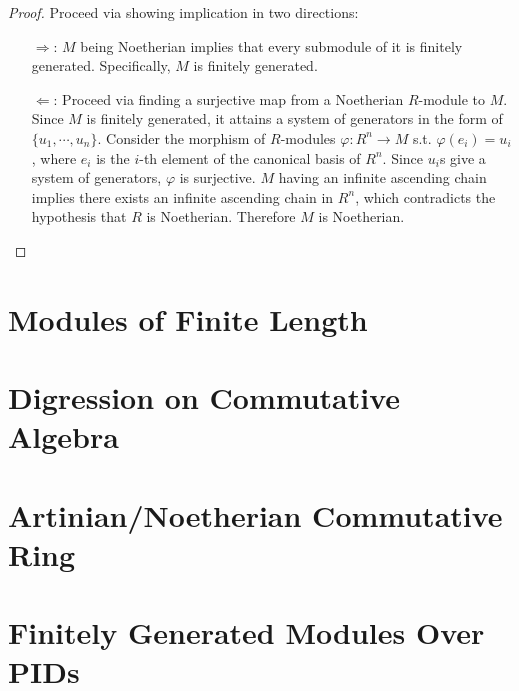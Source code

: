 \documentclass{article}
\begin{document}
\begin{proof}
    Proceed via showing implication in two directions:
    \begin{itemize}
        \item[$\Rightarrow$:] $M$ being Noetherian implies that every submodule of it is finitely generated. Specifically, $M$ is finitely generated. 
        \item[$\Leftarrow$:] Proceed via finding a surjective map from a Noetherian $R$-module to $M$. Since $M$ is finitely generated, it attains a system of generators in the form of $\{ u_1, \cdots, u_n \}$. Consider the morphism of $R$-modules $\varphi: R^n \to M$ s.t. $\varphi(e_i) = u_i$, where $e_i$ is the $i$-th element of the canonical basis of $R^n$. Since $u_i$s give a system of generators, $\varphi$ is surjective. $M$ having an infinite ascending chain implies there exists an infinite ascending chain in $R^n$, which contradicts the hypothesis that $R$ is Noetherian. Therefore $M$ is Noetherian.
    \end{itemize}
\end{proof}

\section{Modules of Finite Length}

\section{Digression on Commutative Algebra}

\section{Artinian/Noetherian Commutative Ring}

\section{Finitely Generated Modules Over PIDs}
\end{document}
